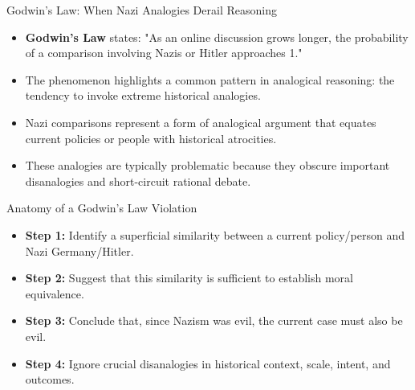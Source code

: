 \documentclass{beamer}
\begin{document}
\begin{frame}{Godwin's Law: When Nazi Analogies Derail Reasoning}
	\begin{itemize}
		\item \textbf{Godwin's Law} states: "As an online discussion grows longer, the probability of a comparison involving Nazis or Hitler approaches 1."
		\item The phenomenon highlights a common pattern in analogical reasoning: the tendency to invoke extreme historical analogies.
		\item Nazi comparisons represent a form of analogical argument that equates current policies or people with historical atrocities.
		\item These analogies are typically problematic because they obscure important disanalogies and short-circuit rational debate.
	\end{itemize}
	
	\begin{exampleblock}{Anatomy of a Godwin's Law Violation}
		\scriptsize
		\begin{itemize}
			\item \textbf{Step 1:} Identify a superficial similarity between a current policy/person and Nazi Germany/Hitler.
			\item \textbf{Step 2:} Suggest that this similarity is sufficient to establish moral equivalence.
			\item \textbf{Step 3:} Conclude that, since Nazism was evil, the current case must also be evil.
			\item \textbf{Step 4:} Ignore crucial disanalogies in historical context, scale, intent, and outcomes.
		\end{itemize}
	\end{exampleblock}
\end{frame}
\end{document}
